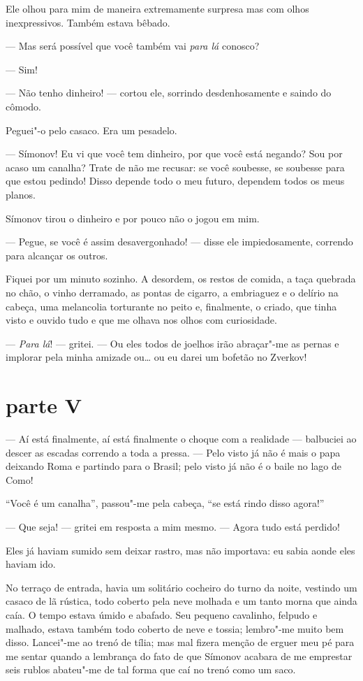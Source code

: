 Ele olhou para mim de maneira extremamente surpresa mas com olhos
inexpressivos. Também estava bêbado.

--- Mas será possível que você também vai \textit{para lá} conosco?

--- Sim!

--- Não tenho dinheiro! --- cortou ele, sorrindo desdenhosamente e saindo do
cômodo.

Peguei"-o pelo casaco. Era um pesadelo.

--- Símonov! Eu vi que você tem dinheiro, por que você está negando? Sou
por acaso um canalha? Trate de não me recusar: se você soubesse, se
soubesse para que estou pedindo! Disso depende todo o meu futuro,
dependem todos os meus planos.

Símonov tirou o dinheiro e por pouco não o jogou em mim.

--- Pegue, se você é assim desavergonhado! --- disse ele impiedosamente,
correndo para alcançar os outros.

Fiquei por um minuto sozinho. A desordem, os restos de comida, a taça
quebrada no chão, o vinho derramado, as pontas de cigarro, a embriaguez
e o delírio na cabeça, uma melancolia torturante no peito e,
finalmente, o criado, que tinha visto e ouvido tudo e que me olhava nos
olhos com curiosidade.

--- \textit{Para lá}! --- gritei. --- Ou eles todos de
joelhos irão abraçar"-me as pernas e implorar pela minha amizade ou\ldots{}
ou eu darei um bofetão no Zverkov!


\section{parte V}

--- Aí está finalmente, aí está finalmente o choque com a realidade ---
balbuciei ao descer as escadas correndo a toda a pressa. --- Pelo visto já
não é mais o papa deixando Roma e partindo para o Brasil; pelo visto já
não é o baile no lago de Como!

``Você é um canalha'', passou"-me pela cabeça, ``se está rindo disso agora!''

--- Que seja! --- gritei em resposta a mim mesmo. --- Agora tudo está perdido!

Eles já haviam sumido sem deixar rastro, mas não importava: eu sabia
aonde eles haviam ido.

No terraço de entrada, havia um solitário cocheiro do turno da noite,
vestindo um casaco de lã rústica, todo coberto pela neve molhada e um
tanto morna que ainda caía. O tempo estava úmido e abafado. Seu pequeno
cavalinho, felpudo e malhado, estava também todo coberto de neve e
tossia; lembro"-me muito bem disso. Lancei"-me ao trenó de tília; mas mal
fizera menção de erguer meu pé para me sentar quando a lembrança do
fato de que Símonov acabara de me emprestar seis rublos abateu"-me de
tal forma que caí no trenó como um saco.

